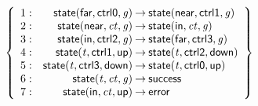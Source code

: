 \documentclass[a4paper]{article}
\def\lthtmlcheckvsize{\ifdim\ht\sizebox<\vsize 
  \ifdim\wd\sizebox<\hsize\expandafter\hfill\fi \expandafter\vfill
  \else\expandafter\vss\fi}%
\begin{document}
{\newpage\clearpage
{}%
$\displaystyle \left\{
\begin{array}{rr@{\>}c@{\>}ll}
\mathrm{1} : 
 & \mathsf{state}(\mathsf{far},\mathsf{ctrl0},\mathit{g})
 & \to 
 & \mathsf{state}(\mathsf{near},\mathsf{ctrl1},\mathit{g})\\
\par
\mathrm{2} : 
 & \mathsf{state}(\mathsf{near},\mathit{ct},\mathit{g})
 & \to 
 & \mathsf{state}(\mathsf{in},\mathit{ct},\mathit{g})\\
\par
\mathrm{3} : 
 & \mathsf{state}(\mathsf{in},\mathsf{ctrl2},\mathit{g})
 & \to 
 & \mathsf{state}(\mathsf{far},\mathsf{ctrl3},\mathit{g})\\
\par
\mathrm{4} : 
 & \mathsf{state}(\mathit{t},\mathsf{ctrl1},\mathsf{up})
 & \to 
 & \mathsf{state}(\mathit{t},\mathsf{ctrl2},\mathsf{down})\\
\par
\mathrm{5} : 
 & \mathsf{state}(\mathit{t},\mathsf{ctrl3},\mathsf{down})
 & \to 
 & \mathsf{state}(\mathit{t},\mathsf{ctrl0},\mathsf{up})\\
\par
\mathrm{6} : 
 & \mathsf{state}(\mathit{t},\mathit{ct},\mathit{g})
 & \to 
 & \mathsf{success}\\
\par
\mathrm{7} : 
 & \mathsf{state}(\mathsf{in},\mathit{ct},\mathsf{up})
 & \to 
 & \mathsf{error}\\
\par
\end{array}
\right\}
$%
\lthtmlindisplaymathZ
\lthtmlcheckvsize\clearpage}

\end{document}
